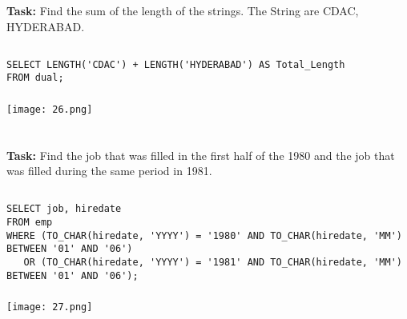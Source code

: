 \documentclass[12pt,a4paper]{article}
\begin{document}

\section{}
\textbf{Task:} Find the sum of the length of the strings. The String are CDAC,
HYDERABAD.

\subsection{}
\begin{lstlisting}
SELECT LENGTH('CDAC') + LENGTH('HYDERABAD') AS Total_Length
FROM dual;
\end{lstlisting}

\subsubsection{}
\begin{center}
    \texttt{[image: 26.png]}
\end{center}


\section{}
\textbf{Task:} Find the job that was filled in the first half of the 1980 and the job that
was filled during the same period in 1981.

\subsection{}
\begin{lstlisting}
SELECT job, hiredate
FROM emp
WHERE (TO_CHAR(hiredate, 'YYYY') = '1980' AND TO_CHAR(hiredate, 'MM') BETWEEN '01' AND '06')
   OR (TO_CHAR(hiredate, 'YYYY') = '1981' AND TO_CHAR(hiredate, 'MM') BETWEEN '01' AND '06');
\end{lstlisting}

\subsubsection{}
\begin{center}
    \texttt{[image: 27.png]}
\end{center}
\end{document}
